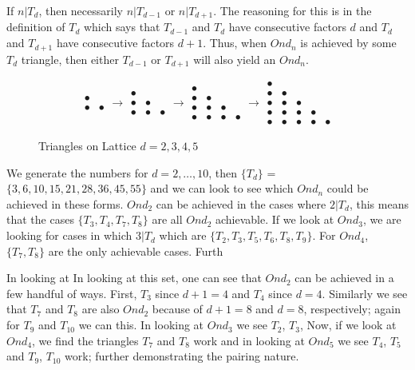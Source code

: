 \documentclass[11pt,reqno]{amsart}
\theoremstyle{mydef}
\begin{document}
If $n \vert T_d$, then necessarily $n \vert T_{d-1}$ or $n \vert T_{d+1}$. The reasoning for this is in the definition of $T_d$
which says that $T_{d-1}$ and $T_d$ have consecutive factors $d$ and $T_d$ and $T_{d+1}$ have
consecutive factors $d+1$. Thus, when $Ond_n$ is achieved by some $T_d$ triangle, then either
$T_{d-1}$ or $T_{d+1}$ will also yield an $Ond_n$.

\begin{figure}[h]
\[  \begin{array}{cc}
\bullet & \ \\
\bullet & \bullet
\end{array} 
\rightarrow
%
\begin{array}{ccc}
\bullet & \  & \ \\
\bullet & \bullet \\
\bullet & \bullet & \bullet 
\end{array}
\rightarrow
\begin{array}{cccc}
\bullet & \  & \  & \  \\
\bullet & \bullet & \  & \  \\
\bullet & \bullet & \bullet & \  \\
\bullet & \bullet & \bullet & \bullet
\end{array}
\rightarrow
\begin{array}{ccccc}
\bullet & \  & \  & \  & \  \\
\bullet & \bullet & \   & \  & \  \\
\bullet & \bullet & \bullet  & \ & \  \\
\bullet & \bullet & \bullet & \bullet & \  \\
\bullet & \bullet & \bullet & \bullet & \bullet
\end{array}
\]
\caption{Triangles on Lattice $d = 2, 3, 4, 5$}
\label{fig:trianglegrowth}
\end{figure}

We generate the numbers for $d = 2, \ldots, 10$, then $\{T_d\}$ =
$\{ 3, 6, 10, 15, 21, 28, 36, 45, 55 \}$ and we can look to see which $Ond_n$
could be achieved in these forms. $Ond_2$ can be achieved in the cases where
$2 \vert T_d$, this means that the cases $\{ T_3, T_4, T_7, T_8 \}$ are all $Ond_2$ achievable.
If we look at $Ond_3$, we are looking for cases in which $3 \vert T_d$ which are 
$\{ T_2, T_3, T_5, T_6, T_8, T_9 \}$.  For $Ond_4$, $\{ T_7, T_8 \}$ are the only achievable 
cases. Furth


In looking at   In looking at this set, one can see that  $Ond_2$ can be 
achieved in a few handful of ways.  First, $T_3$ since $d +1 = 4$ and $T_4$ since $d = 4$. 
Similarly we see that $T_7$ and $T_8$ are also $Ond_2$ because of $d + 1 = 8$ and $d = 8$, respectively; again 
for $T_9$ and $T_{10}$ we can this. In looking at $Ond_3$ we see $T_2$, $T_3$, 
Now, if we look at $Ond_4$, we find the triangles $T_7$ and $T_8$ work and
in looking at $Ond_5$ we see $T_4$, $T_5$ and $T_9$, $T_{10}$ work; further demonstrating
the pairing nature.
\end{document}
